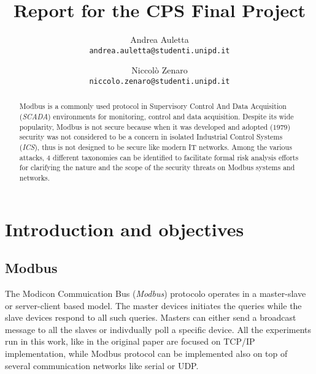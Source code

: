 \documentclass[12pt]{article}
\title{Report for the CPS Final Project}
\author{
    Andrea Auletta \\ \texttt{andrea.auletta@studenti.unipd.it} \and
    Niccolò Zenaro \\ \texttt{niccolo.zenaro@studenti.unipd.it}
}
\begin{document}
\maketitle
\newpage
\tableofcontents
\newpage

\begin{abstract}
Modbus is a commonly used protocol in Supervisory Control And Data Acquisition (\textit{SCADA}) environments
for monitoring, control and data acquisition. Despite its wide popularity, Modbus is not secure because when it was developed and adopted ($1979$) security was not considered to be a concern in isolated Industrial Control Systems (\textit{ICS}), thus is not designed to be secure like modern IT networks.
Among the various attacks, 4 different taxonomies can be identified to facilitate formal risk analysis efforts for clarifying the nature and the scope of the security threats on Modbus systems and networks.
\end{abstract}

\section{Introduction and objectives}
\subsection{Modbus}
The Modicon Commuication Bus (\textit{Modbus}) protocolo operates in a master-slave or server-client based model. The master devices initiates the queries while the slave devices respond to all such queries.
Masters can either send a broadcast message to all the slaves or indivdually poll a specific device. 
All the experiments run in this work, like in the original paper \cite{huitsing2008attack} are focused on TCP/IP implementation, while Modbus protocol can be implemented also on top of several communication networks like serial or UDP. 
\end{document}
